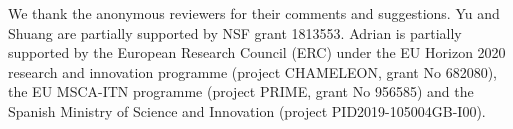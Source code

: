 \begin{acks}
    We thank the anonymous reviewers for their comments and suggestions.
    Yu and Shuang are partially supported by NSF grant 1813553.
    Adrian is partially supported by the European Research Council (ERC) under the EU Horizon 2020 research and innovation programme (project CHAMELEON, grant No 682080), the EU MSCA-ITN programme (project PRIME, grant No 956585) and the Spanish Ministry of Science and Innovation (project PID2019-105004GB-I00).
\end{acks}
